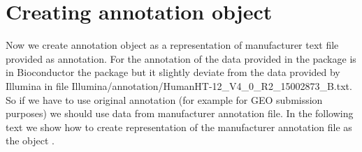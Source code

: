 \section{Creating annotation object}
Now we create annotation object as a representation of manufacturer text file provided as annotation. For the annotation of the data provided in the  package is in Bioconductor the package  but it slightly deviate from the data provided by Illumina in file  Illumina/annotation/HumanHT-12\_V4\_0\_R2\_15002873\_B.txt. So if we have to use original annotation (for example for GEO submission purposes) we should use data from manufacturer annotation file. In the following text we show how to create representation of the manufacturer annotation file as the object .